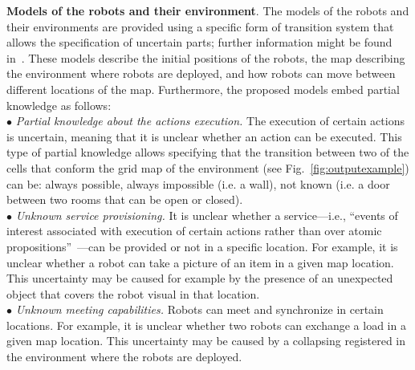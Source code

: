 \textbf{Models of the robots and their environment}. 
The models of the robots and their environments are provided using a specific form of transition system that allows the specification of uncertain parts; further information might be found in~\cite{menghi2018multi}.
These models describe the initial positions of the robots, the map describing the environment where robots are deployed, and how robots can move between different locations of the map. 
Furthermore, the proposed models embed partial knowledge as follows:\\
$\bullet$  \emph{Partial knowledge about the actions execution.} 
The execution of certain actions is uncertain, meaning that it is unclear whether an action can be executed.
This type of partial knowledge allows specifying that the transition between two of the cells that conform the grid map of the environment (see Fig.~\ref{fig:outputexample}) can be:
always possible, always impossible (i.e. a wall), not known (i.e. a door between two rooms that can be open or closed).\\
$\bullet$ \emph{Unknown service provisioning.} 
It is unclear  whether a service---i.e.,  ``events of interest associated with execution of certain actions rather than over atomic propositions''~\cite{guo2015multi}---can be provided or not in a specific location. 
For example, it is unclear whether a robot can take a picture of an item in a given map location.
This  uncertainty may be caused for example by the presence of an unexpected object that covers the robot visual in that location.\\
$\bullet$ \emph{Unknown meeting capabilities.} Robots can meet and synchronize in certain locations.
For example, it is unclear whether two robots can exchange a load in a given map location.
This uncertainty may be caused by a collapsing registered in the environment where the robots are deployed.


